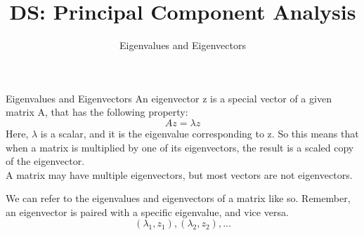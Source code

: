 \documentclass[aspectratio=169]{../latex_main/tntbeamer}  %
\title[Introduction]{DS: Principal Component Analysis}
\subtitle{Eigenvalues and Eigenvectors}
\begin{document}
	
	\maketitle
	\begin{frame}{Eigenvalues and Eigenvectors}
	    An eigenvector z is a special vector of a given matrix A, that has the following property:
	    \begin{equation*}
	        Az = \lambda z
	    \end{equation*}
	    Here, $\lambda$ is a scalar, and it is the eigenvalue corresponding to z. So this means that when a matrix is multiplied by one of its eigenvectors, the result is a scaled copy of the eigenvector.\\
	    A matrix may have multiple eigenvectors, but most vectors are not eigenvectors.\\
	    \bigskip
	    
        We can refer to the eigenvalues and eigenvectors of a matrix like so. Remember, an eigenvector is paired with a specific eigenvalue, and vice versa.
        \begin{equation*}
            (\lambda_1,z_1),(\lambda_2,z_2),...
        \end{equation*}
        

	\end{frame}
	
\end{document}

